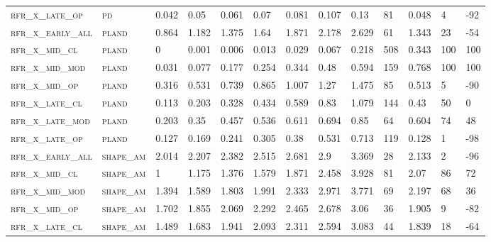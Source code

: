 \begin{landscape}
\begin{center}
\begin{footnotesize}
\begin{longtable}{lllllllllllll}
\textsc{rfr\_x\_late\_op  } & \textsc{pd        }   & 0.042   & 0.05    & 0.061    & 0.07     & 0.081    & 0.107    & 0.13     & 81   & 0.048   & 4   & -92   \\
\textsc{rfr\_x\_early\_all} & \textsc{pland     }   & 0.864   & 1.182   & 1.375    & 1.64     & 1.871    & 2.178    & 2.629    & 61   & 1.343   & 23  & -54   \\
\textsc{rfr\_x\_mid\_cl   } & \textsc{pland     }   & 0       & 0.001   & 0.006    & 0.013    & 0.029    & 0.067    & 0.218    & 508  & 0.343   & 100 & 100   \\
\textsc{rfr\_x\_mid\_mod  } & \textsc{pland     }   & 0.031   & 0.077   & 0.177    & 0.254    & 0.344    & 0.48     & 0.594    & 159  & 0.768   & 100 & 100   \\
\textsc{rfr\_x\_mid\_op   } & \textsc{pland     }   & 0.316   & 0.531   & 0.739    & 0.865    & 1.007    & 1.27     & 1.475    & 85   & 0.513   & 5   & -90   \\
\textsc{rfr\_x\_late\_cl  } & \textsc{pland     }   & 0.113   & 0.203   & 0.328    & 0.434    & 0.589    & 0.83     & 1.079    & 144  & 0.43    & 50  & 0     \\
\textsc{rfr\_x\_late\_mod } & \textsc{pland     }   & 0.203   & 0.35    & 0.457    & 0.536    & 0.611    & 0.694    & 0.85     & 64   & 0.604   & 74  & 48    \\
\textsc{rfr\_x\_late\_op  } & \textsc{pland     }   & 0.127   & 0.169   & 0.241    & 0.305    & 0.38     & 0.531    & 0.713    & 119  & 0.128   & 1   & -98   \\
\textsc{rfr\_x\_early\_all} & \textsc{shape\_am }   & 2.014   & 2.207   & 2.382    & 2.515    & 2.681    & 2.9      & 3.369    & 28   & 2.133   & 2   & -96   \\
\textsc{rfr\_x\_mid\_cl   } & \textsc{shape\_am }   & 1       & 1.175   & 1.376    & 1.579    & 1.871    & 2.458    & 3.928    & 81   & 2.07    & 86  & 72    \\
\textsc{rfr\_x\_mid\_mod  } & \textsc{shape\_am }   & 1.394   & 1.589   & 1.803    & 1.991    & 2.333    & 2.971    & 3.771    & 69   & 2.197   & 68  & 36    \\
\textsc{rfr\_x\_mid\_op   } & \textsc{shape\_am }   & 1.702   & 1.855   & 2.069    & 2.292    & 2.465    & 2.678    & 3.06     & 36   & 1.905   & 9   & -82   \\
\textsc{rfr\_x\_late\_cl  } & \textsc{shape\_am }   & 1.489   & 1.683   & 1.941    & 2.093    & 2.311    & 2.594    & 3.083    & 44   & 1.839   & 18  & -64   \\

\end{longtable}
\end{footnotesize}
\end{center}
\end{landscape}
